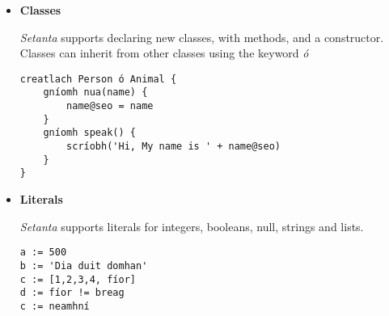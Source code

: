\documentclass[11pt]{extarticle}
\newcommand{\Setanta}{\emph{Setanta}}
\begin{document}
\begin{itemize}
            Functions in \Setanta{} are referred to with the term ``gníomh'' meaning ``action''. They can constructed with the \lstinline[language=setanta]|gníomh| keyword, followed by a name and argument list. The \lstinline[language=setanta]|toradh| keyword can be used to return values from the function.
            \begin{lstlisting}[language=setanta, frame=single, caption=Setanta function example]
gníomh fibonacci(n) {
    má n <= 1
        toradh 1
    toradh fibonacci(n-1) + fibonacci(n-2)
}
            \end{lstlisting}
        \item \textbf{Classes}

            \Setanta{} supports declaring new classes, with methods, and a constructor.  Classes can inherit from other classes using the keyword \emph{ó}
            \begin{lstlisting}[language=setanta, frame=single, caption=Setanta classe example]
creatlach Person ó Animal {
    gníomh nua(name) {
        name@seo = name
    }
    gníomh speak() {
        scríobh('Hi, My name is ' + name@seo)
    }
}
            \end{lstlisting}
        \item \textbf{Literals}

            \Setanta{} supports literals for integers, booleans, null, strings and lists.
            \begin{lstlisting}[language=setanta, frame=single, caption=Setanta literals]
a := 500
b := 'Dia duit domhan'
c := [1,2,3,4, fíor]
d := fíor != breag
c := neamhní
            \end{lstlisting}
\end{itemize}
\end{document}
